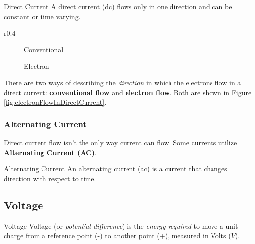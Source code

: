 \documentclass[12pt]{article}
\begin{document}
\begin{definition}{Direct Current}
  A direct current (dc) flows only in one direction and can be constant or time varying.
\end{definition}

\begin{wrapfigure}[5]{r}{0.4\textwidth}
  \centering
  \begin{subfigure}[H]{0.15\textwidth}
    \centering
    
    \caption{Conventional}
    \label{fig:001}
  \end{subfigure}
  \begin{subfigure}[H]{0.15\textwidth}
    \centering
    
    \caption{Electron}
    \label{fig:002}
  \end{subfigure}
  \caption{Electron Flow in Direct Currents}
  \label{fig:electronFlowInDirectCurrent}
\end{wrapfigure}

There are two ways of describing the \textit{direction} in which the electrons flow in a direct current: \textbf{conventional flow} and \textbf{electron flow}. Both are shown in Figure \ref{fig:electronFlowInDirectCurrent}.

\subsubsection{Alternating Current}
\label{sssec:alternatingCurrent}

Direct current flow isn't the only way current can flow. Some currents utilize \textbf{Alternating Current (AC)}.

\begin{definition}{Alternating Current}
  An alternating current (ac) is a current that changes direction with respect to time.
\end{definition}

\subsection{Voltage}
\label{ssec:voltage}

\begin{definition}{Voltage}
  Voltage (or \textit{potential difference}) is the \textit{energy required} to move a unit charge from a reference point (-) to another point (+), measured in Volts ($V$).
\end{definition}
\end{document}
